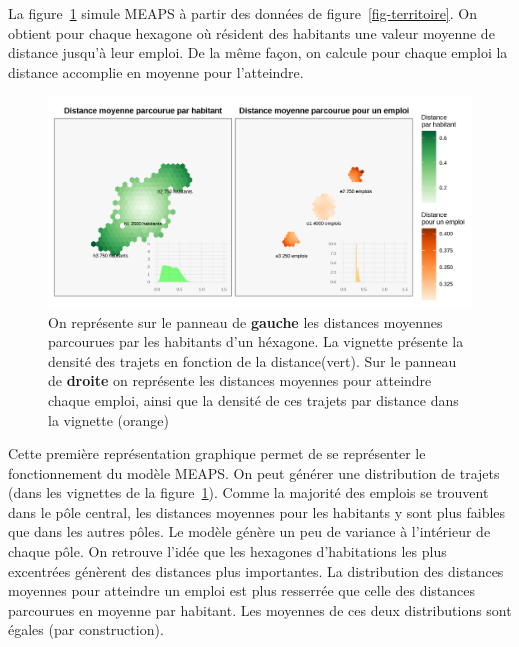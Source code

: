 \documentclass[
  10pt,
  a4paper,
  numbers=noendperiod,
  DIV=12]{scrartcl}
\begin{document}
La figure~\ref{fig-distances} simule MEAPS à partir des données de
figure~\ref{fig-territoire}. On obtient pour chaque hexagone où résident
des habitants une valeur moyenne de distance jusqu'à leur emploi. De la
même façon, on calcule pour chaque emploi la distance accomplie en
moyenne pour l'atteindre.

\begin{figure}[htb]

{\centering \includegraphics[width=1\textwidth,height=\textheight]{output/gdistances.png}

}

\caption[Distances moyenne par habitant et pour un
emploi]{\label{fig-distances}On représente sur le panneau de
\textbf{gauche} les distances moyennes parcourues par les habitants d'un
héxagone. La vignette présente la densité des trajets en fonction de la
distance(vert). Sur le panneau de \textbf{droite} on représente les
distances moyennes pour atteindre chaque emploi, ainsi que la densité de
ces trajets par distance dans la vignette (orange)}

\end{figure}

Cette première représentation graphique permet de se représenter le
fonctionnement du modèle MEAPS. On peut générer une distribution de
trajets (dans les vignettes de la figure~\ref{fig-distances}). Comme la
majorité des emplois se trouvent dans le pôle central, les distances
moyennes pour les habitants y sont plus faibles que dans les autres
pôles. Le modèle génère un peu de variance à l'intérieur de chaque pôle.
On retrouve l'idée que les hexagones d'habitations les plus excentrées
génèrent des distances plus importantes. La distribution des distances
moyennes pour atteindre un emploi est plus resserrée que celle des
distances parcourues en moyenne par habitant. Les moyennes de ces deux
distributions sont égales (par construction).
\end{document}
